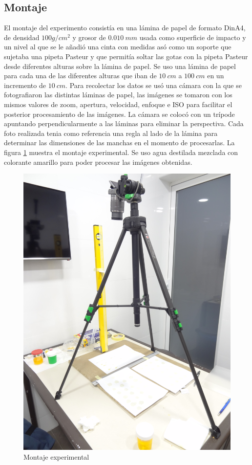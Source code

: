 \subsection{Montaje} \label{sub:montaje} El montaje del experimento consistía
en una lámina de papel de formato DinA4, de densidad $100g/cm^2$ y grosor de
$0.010\ mm$ usada como superficie de impacto y un nivel al que se le añadió una
cinta con medidas asó como un soporte que sujetaba una pipeta Pasteur y que
permitía soltar las gotas con la pipeta Pasteur desde diferentes alturas sobre
la lámina de papel.  Se uso una lámina de papel para cada una de las diferentes
alturas que iban de $10\ cm$ a $100\ cm$ en un incremento de $10\ cm$. Para
recolectar los datos se usó una cámara con la que se fotografiaron las
distintas láminas de papel, las imágenes se tomaron con los mismos valores de
zoom, apertura, velocidad, enfoque e ISO para facilitar el posterior
procesamiento de las imágenes. La cámara se colocó con un trípode apuntando
perpendicularmente a las láminas para eliminar la perspectiva. Cada foto
realizada tenia como referencia una regla al lado de la lámina para determinar
las dimensiones de las manchas en el momento de procesarlas. La figura
\ref{fig:montaje} muestra el montaje experimental.  Se uso agua destilada
mezclada con colorante amarillo para poder procesar las imágenes obtenidas.

\begin{figure}[htpb] \centering
\includegraphics[width=0.8\linewidth,angle=90]{src/montaje.jpg}
\caption{Montaje experimental} \label{fig:montaje} \end{figure}

